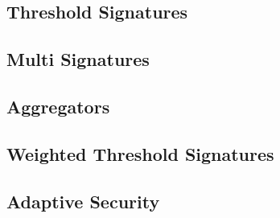 \subsubsection{}

\subsection{Threshold Signatures}

\subsection{Multi Signatures}

\subsection{Aggregators}

\subsection{Weighted Threshold Signatures}

\subsection{Adaptive Security}
